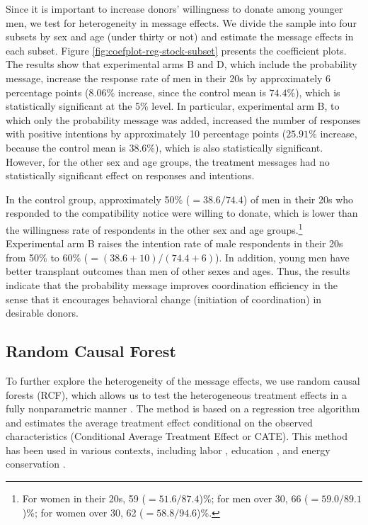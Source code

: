 \documentclass[12pt, a4paper]{article}
\begin{document}
Since it is important to increase donors' willingness to donate among younger men, we test for heterogeneity in message effects. We divide the sample into four subsets by sex and age (under thirty or not) and estimate the message effects in each subset. Figure \ref{fig:coefplot-reg-stock-subset} presents the coefficient plots. The results show that experimental arms B and D, which include the probability message, increase the response rate of men in their 20s by approximately 6 percentage points (\(8.06\)\% increase, since the control mean is \(74.4\)\%), which is statistically significant at the 5\% level. In particular, experimental arm B, to which only the probability message was added, increased the number of responses with positive intentions by approximately 10 percentage points (\(25.91\)\% increase, because the control mean is \(38.6\)\%), which is also statistically significant. However, for the other sex and age groups, the treatment messages had no statistically significant effect on responses and intentions.

In the control group, approximately 50\% (\(=38.6/74.4\)) of men in their 20s who responded to the compatibility notice were willing to donate, which is lower than the willingness rate of respondents in the other sex and age groups.\footnote{For women in their 20s, 59 (\(=51.6/87.4\))\%; for men over 30, 66 (\(=59.0/89.1\))\%; for women over 30, 62 (\(=58.8/94.6\))\%.} Experimental arm B raises the intention rate of male respondents in their 20s from 50\% to 60\% (\(=(38.6 + 10)/(74.4 + 6)\)). In addition, young men have better transplant outcomes than men of other sexes and ages. Thus, the results indicate that the probability message improves coordination efficiency in the sense that it encourages behavioral change (initiation of coordination) in desirable donors.

\hypertarget{rcf}{%
\subsection{Random Causal Forest}\label{rcf}}

To further explore the heterogeneity of the message effects, we use random causal forests (RCF), which allows us to test the heterogeneous treatment effects in a fully nonparametric manner \citep{Athey2016, Wager2018}. The method is based on a regression tree algorithm and estimates the average treatment effect conditional on the observed characteristics (Conditional Average Treatment Effect or CATE). This method has been used in various contexts, including labor \citep{Davis2017}, education \citep{Carlana2022}, and energy conservation \citep{Murakami2022}.
\end{document}
